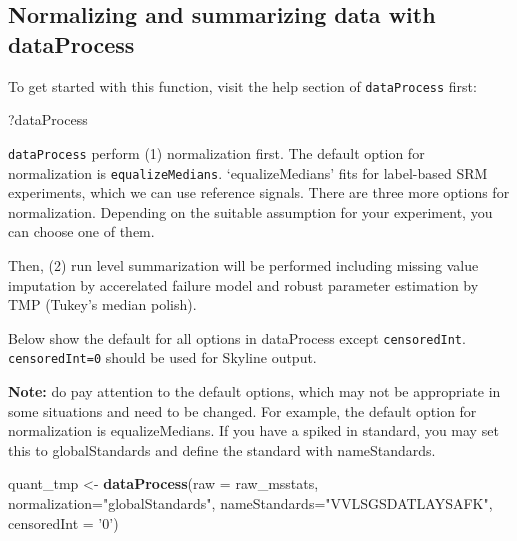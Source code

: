 \documentclass[]{book}
\newenvironment{Shaded}{\begin{snugshade}}{\end{snugshade}}
\newcommand{\DataTypeTok}[1]{\textcolor[rgb]{0.13,0.29,0.53}{#1}}
\newcommand{\KeywordTok}[1]{\textcolor[rgb]{0.13,0.29,0.53}{\textbf{#1}}}
\newcommand{\NormalTok}[1]{#1}
\newcommand{\StringTok}[1]{\textcolor[rgb]{0.31,0.60,0.02}{#1}}
\begin{document}
\hypertarget{normalizing-and-summarizing-data-with-dataprocess}{%
\subsection{Normalizing and summarizing data with dataProcess}\label{normalizing-and-summarizing-data-with-dataprocess}}

To get started with this function, visit the help section of \texttt{dataProcess} first:

\begin{Shaded}
\begin{Highlighting}[]
\NormalTok{?dataProcess}
\end{Highlighting}
\end{Shaded}

\texttt{dataProcess} perform (1) normalization first. The default option for normalization is \texttt{equalizeMedians}. `equalizeMedians' fits for label-based SRM experiments, which we can use reference signals. There are three more options for normalization. Depending on the suitable assumption for your experiment, you can choose one of them.

Then, (2) run level summarization will be performed including missing value imputation by accerelated failure model and robust parameter estimation by TMP (Tukey's median polish).

Below show the default for all options in dataProcess except \texttt{censoredInt}. \texttt{censoredInt=\textquotesingle{}0\textquotesingle{}} should be used for Skyline output.

\textbf{Note:} do pay attention to the default options, which may not be appropriate in some situations and need to be changed. For example, the default option for normalization is equalizeMedians. If you have a spiked in standard, you may set this to globalStandards and define the standard with nameStandards.

\begin{Shaded}
\begin{Highlighting}[]
\NormalTok{quant_tmp <-}\StringTok{ }\KeywordTok{dataProcess}\NormalTok{(}\DataTypeTok{raw =}\NormalTok{ raw_msstats, }
                         \DataTypeTok{normalization=}\StringTok{"globalStandards"}\NormalTok{, }
                         \DataTypeTok{nameStandards=}\StringTok{"VVLSGSDATLAYSAFK"}\NormalTok{,}
                         \DataTypeTok{censoredInt =} \StringTok{'0'}\NormalTok{)}
\end{Highlighting}
\end{Shaded}
\end{document}
